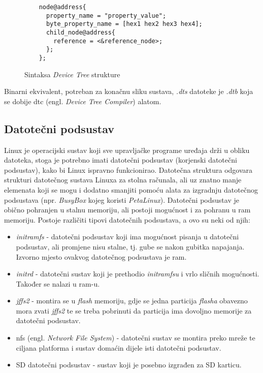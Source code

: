\documentclass[times, utf8, diplomski, numeric]{fer}
\begin{document}
\begin{figure}[H]
  \centering
  \lstset{xleftmargin=.1\textwidth}
  \begin{lstlisting}
    node@address{
      property_name = "property_value";
      byte_property_name = [hex1 hex2 hex3 hex4];
      child_node@address{
        reference = <&reference_node>;
      };
    };
  \end{lstlisting}
  \caption{Sintaksa \textit{Device Tree} strukture}
  \label{devtree_sintax}
\end{figure}

Binarni ekvivalent, potreban za konačnu sliku sustava, \textit{.dts} datoteke je \textit{.dtb} koja se dobije \gls{dtc} (engl.
\textit{Device Tree Compiler}) alatom.

\subsection{Datotečni podsustav}
Linux je operacijski sustav koji sve upravljačke programe uređaja drži u obliku datoteka, stoga je potrebno imati datotečni
podsustav (korjenski datotečni podsustav), kako bi Linux ispravno funkcionirao. Datotečna struktura odgovara strukturi
datotečnog sustava Linuxa za stolna računala, ali uz znatno manje elemenata koji se mogu i dodatno smanjiti pomoću alata
za izgradnju datotečnog podsustava (npr. \textit{BusyBox} kojeg koristi \textit{PetaLinux}). Datotečni podsustav je obično
pohranjen u stalnu memoriju, ali postoji mogućnost i za pohranu u \gls{ram} memoriju.
Postoje različiti tipovi datotečnih podsustava, a ovo su neki od njih:
\begin{itemize}
  \item{\textit{initramfs} - datotečni podsustav koji ima mogućnost pisanja u datotečni podsustav, ali promjene nisu stalne,
  tj. gube se nakon gubitka napajanja. Izvorno mjesto ovakvog datotečnog podsustava je \gls{ram}.}
  \item{\textit{initrd} - datotečni sustav koji je prethodio \textit{initramfsu} i vrlo sličnih mogućnosti. Također se nalazi
  u \gls{ram}-u.}
  \item{\textit{jffs2} - montira se u \textit{flash} memoriju, gdje se jedna particija \textit{flasha} obavezno mora zvati
  \textit{jffs2} te se treba pobrinuti da particija ima dovoljno memorije za datotečni podsustav.}
  \item{\gls{nfs} (engl. \textit{Network File System}) - datotečni sustav se montira preko mreže te ciljana platforma i sustav
  domaćin dijele isti datotečni podsustav.}
  \item{SD datotečni podsustav - sustav koji je posebno izgrađen za SD karticu.}
\end{itemize}
\end{document}
